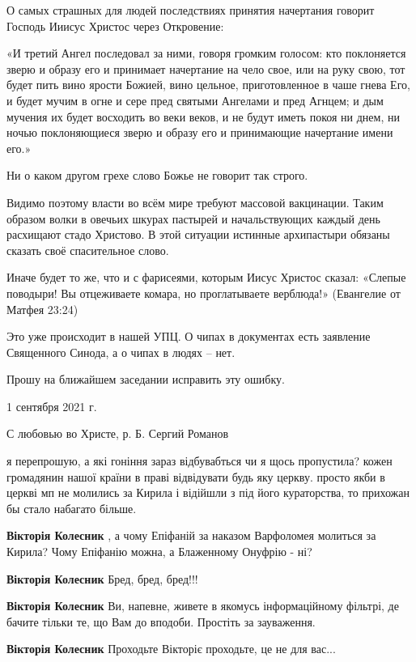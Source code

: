 \begin{itemize}
О самых страшных для людей последствиях принятия начертания говорит Господь
Ииисус Христос через Откровение:

«И третий Ангел последовал за ними, говоря громким голосом: кто поклоняется
зверю и образу его и принимает начертание на чело свое, или на руку свою, тот
будет пить вино ярости Божией, вино цельное, приготовленное в чаше гнева Его, и
будет мучим в огне и сере пред святыми Ангелами и пред Агнцем; и дым мучения их
будет восходить во веки веков, и не будут иметь покоя ни днем, ни ночью
поклоняющиеся зверю и образу его и принимающие начертание имени его.»

Ни о каком другом грехе слово Божье не говорит так строго.

Видимо поэтому власти во всём мире требуют массовой вакцинации. Таким образом
волки в овечьих шкурах пастырей и начальствующих каждый день расхищают стадо
Христово. В этой ситуации истинные архипастыри обязаны сказать своё
спасительное слово.

Иначе будет то же, что и с фарисеями, которым Иисус Христос сказал: «Слепые
поводыри! Вы отцеживаете комара, но проглатываете верблюда!» (Евангелие от
Матфея 23:24)

Это уже происходит в нашей УПЦ. О чипах в документах есть заявление Священного
Синода, а о чипах в людях – нет.

Прошу на ближайшем заседании исправить эту ошибку.

1 сентября 2021 г.

С любовью во Христе, р. Б. Сергий Романов


я перепрошую, а які гоніння зараз відбувабться чи я щось пропустила? кожен
громадянин нашої країни в праві відвідувати будь яку церкву. просто якби в
церкві мп не молились за Кирила і відійшли з під його кураторства, то прихожан
бы стало набагато більше.

\begin{itemize} %
\textbf{Вікторія Колесник} , а чому Епіфаній за наказом Варфоломея молиться за Кирила? Чому Епіфанію можна, а Блаженному Онуфрію - ні?

\textbf{Вікторія Колесник} Бред, бред, бред!!!

\textbf{Вікторія Колесник} Ви, напевне, живете в якомусь інформаційному фільтрі, де бачите тільки те, що Вам до вподоби. Простіть за зауваження.

\textbf{Вікторія Колесник} Проходьте Вікторіє проходьте, це не для вас...


\end{itemize}
\end{itemize}
